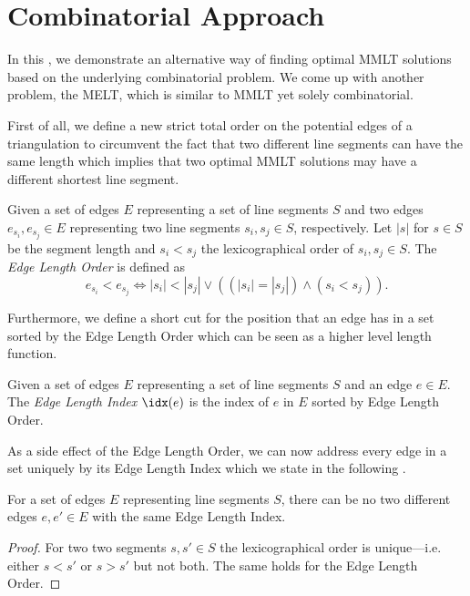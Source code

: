 \section{Combinatorial Approach}
\label{sec:combinatorial_approach}
In this , we demonstrate an
alternative way of finding optimal \gls{MMLT} solutions based on the
underlying combinatorial problem. We come up with another problem, the
\gls{MELT}, which is similar to \gls{MMLT} yet solely combinatorial.

First of all, we define a new strict total order on the potential
edges of a triangulation to circumvent the fact that two different
line segments can have the same length which implies that two optimal
\gls{MMLT} solutions may have a different shortest line segment.

\begin{definition}
  \label{def:edge_length_order}
  Given a set of edges \(E\) representing a set of line segments
  \(S\) and two edges \(e_{s_i}, e_{s_j} \in E\) representing two
  line segments \(s_i,s_j \in S\), respectively. Let \(|s|\) for
  \(s \in S\) be the segment length and \( s_i < s_j \) the
  lexicographical order of \(s_i, s_j \in S\). The \emph{Edge Length
  Order} is defined as  
  \[
    e_{s_i} < e_{s_j}
    \iff |s_i| < |s_j|
    \lor ((|s_i| = |s_j|) \land (s_i < s_j)).
  \]
\end{definition}

Furthermore, we define a short cut for the position that an edge has
in a set sorted by the Edge Length Order which can be seen as a
higher level length function.

\begin{definition}
  \label{def:edge_length_index}
  Given a set of edges \(E\) representing a set of line segments
  \(S\) and an edge \(e \in E\). The \emph{Edge Length Index}
  \(\idx(e)\) is the index of \(e\) in \(E\) sorted by 
  Edge Length Order.
\end{definition}

As a side effect of the Edge Length Order, we can now address every
edge in a set uniquely by its Edge Length Index which we state in the
following .

\begin{theorem}
  \label{thm:edge_length_index_uniqueness}
  For a set of edges \(E\) representing line segments \(S\),
  there can be no two different edges \(e, e' \in E\)
  with the same Edge Length Index.
  \begin{proof}
  For two two segments \(s, s' \in S\) the lexicographical order is
  unique---i.e. either \(s < s'\) or \(s > s'\) but not both. The
  same holds for the Edge Length Order.
  \end{proof}
\end{theorem}

